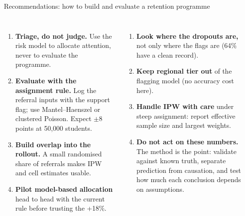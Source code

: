 \documentclass[aspectratio=169,11pt]{beamer}
\newcommand{\key}[1]{\textcolor{paperblue}{\textbf{#1}}}
\begin{document}
\begin{frame}{Recommendations: how to build and evaluate a retention programme}
\begin{columns}[T]
\begin{enumerate}\setlength\itemsep{2.5pt}\small
\item \key{Triage, do not judge.} Use the risk model to allocate attention, never to evaluate the programme.
\item \key{Evaluate with the assignment rule.} Log the referral inputs with the support flag; use Mantel--Haenszel or clustered Poisson. Expect $\pm 8$ points at 50,000 students.
\item \key{Build overlap into the rollout.} A small randomised share of referrals makes IPW and cell estimates usable.
\item \key{Pilot model-based allocation} head to head with the current rule before trusting the +18\%.
\end{enumerate}
\begin{enumerate}\setlength\itemsep{2.5pt}\small\setcounter{enumi}{4}
\item \key{Look where the dropouts are,} not only where the flags are (64\% have a clean record).
\item \key{Keep regional tier out} of the flagging model (no accuracy cost here).
\item \key{Handle IPW with care} under steep assignment: report effective sample size and largest weights.
\item \key{Do not act on these numbers.} The method is the point: validate against known truth, separate prediction from causation, and test how much each conclusion depends on assumptions.
\end{enumerate}
\end{columns}
\end{frame}
\end{document}
